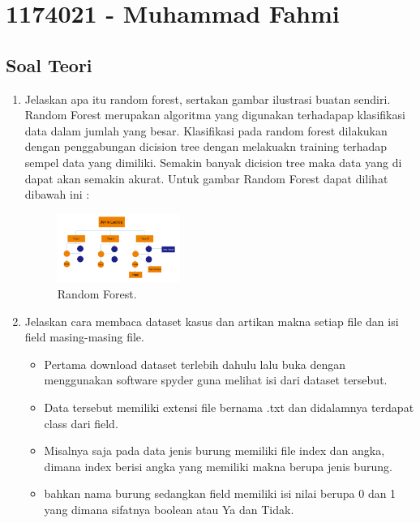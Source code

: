 \section{1174021 - Muhammad Fahmi}
\subsection{Soal Teori}
\begin{enumerate}

	\item Jelaskan apa itu random forest, sertakan gambar ilustrasi buatan sendiri.
	\hfill\break
	Random Forest merupakan algoritma yang digunakan terhadapap klasifikasi data dalam jumlah yang besar. Klasifikasi pada random forest dilakukan dengan penggabungan dicision tree dengan melakuakn training terhadap sempel data yang dimiliki. Semakin banyak dicision tree maka data yang di dapat akan semakin akurat. Untuk gambar Random Forest dapat dilihat dibawah ini :

	\begin{figure}[H]
	\centering
		\includegraphics[width=4cm]{figures/1174021/tugas3/materi/1.PNG}
		\caption{Random Forest.}
	\end{figure}

	\item Jelaskan cara membaca dataset kasus dan artikan makna setiap file dan isi field masing-masing file.
	\hfill\break

	\begin{itemize}
		\item Pertama download dataset terlebih dahulu lalu buka dengan menggunakan software spyder guna melihat isi dari dataset tersebut.

		\item Data tersebut memiliki extensi file bernama .txt dan didalamnya terdapat class dari field.

		\item Misalnya saja pada data jenis burung memiliki file index dan angka, dimana index berisi angka yang memiliki makna berupa jenis burung.

		\item bahkan nama burung sedangkan field memiliki isi nilai berupa 0 dan 1 yang dimana sifatnya boolean atau Ya dan Tidak.


\end{itemize}
\end{enumerate}
